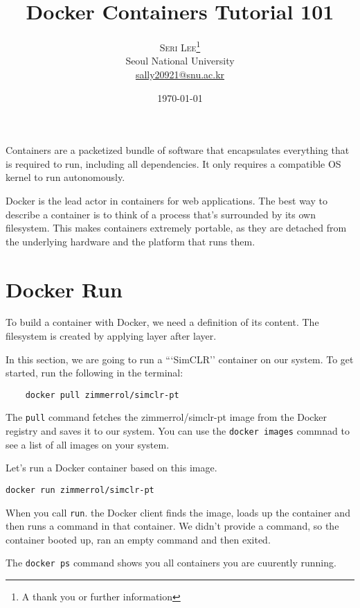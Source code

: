 \documentclass[twoside,twocolumn]{article}
\title{Docker Containers Tutorial 101} %
\author{%
\textsc{Seri Lee}\thanks{A thank you or further information} \\[1ex] %
\normalsize Seoul National University \\ %
\normalsize \href{mailto:sally20921@snu.ac.kr}{sally20921@snu.ac.kr} %
}
\date{\today} %
\begin{document}
\maketitle


Containers are a packetized bundle of software that encapsulates everything that is required to run, including all dependencies.
It only requires a compatible OS kernel to run autonomously.

Docker is the lead actor in containers for web applications.
The best way to describe a container is to think of a process that's surrounded by its own filesystem.
This makes containers extremely portable, as they are detached from the underlying hardware and the platform that runs them.

\section{Docker Run}
To build a container with Docker, we need a definition of its content.
The filesystem is created by applying layer after layer.

In this section, we are going to run a ```SimCLR'' container on our system.
To get started, run the following in the terminal:
\begin{verbatim}
    docker pull zimmerrol/simclr-pt
\end{verbatim}

The \texttt{pull} command fetches the zimmerrol/simclr-pt image from the Docker registry and saves it to our system.
You can use the \texttt{docker images} commnad to see a list of all images on your system.

Let's run a Docker container based on this image.
\begin{verbatim}
docker run zimmerrol/simclr-pt
\end{verbatim}

When you call \texttt{run}. the Docker client finds the image, loads up the container and then runs a command in that container.
We didn't provide a command, so the container booted up, ran an empty command and then exited.

The \texttt{docker ps} command shows you all containers you are cuurently running.
\end{document}

